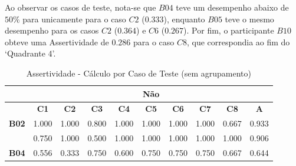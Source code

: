 Ao observar os casos de teste, nota-se que $B04$ teve um desempenho abaixo de $50\%$ para unicamente para o caso $C2$ ($0.333$), enquanto $B05$ teve o mesmo desempenho para os casos $C2$ ($0.364$) e $C6$ ($0.267$). Por fim, o participante $B10$ obteve uma Assertividade de $0.286$ para o caso $C8$, que correspondia ao fim do `Quadrante 4'.

\begin{table}[htbp]
	\centering
	\caption{Assertividade - Cálculo por Caso de Teste (sem agrupamento)}
	\begin{tabular}{|cccccccccc|}
		\hline
		\rowcolor[HTML]{D0CECE} 
		\multicolumn{1}{|c|}{\cellcolor[HTML]{F2F2F2}\textbf{Agrupamento}} & \multicolumn{9}{c|}{Não} \\ \hline
		\rowcolor[HTML]{D0CECE} 
		\multicolumn{1}{|c|}{\cellcolor[HTML]{D0CECE}\textbf{Participante}} & \multicolumn{1}{c|}{\cellcolor[HTML]{D0CECE}\textbf{C1}} & \multicolumn{1}{c|}{\cellcolor[HTML]{D0CECE}\textbf{C2}} & \multicolumn{1}{c|}{\cellcolor[HTML]{D0CECE}\textbf{C3}} & \multicolumn{1}{c|}{\cellcolor[HTML]{D0CECE}\textbf{C4}} & \multicolumn{1}{c|}{\cellcolor[HTML]{D0CECE}\textbf{C5}} & \multicolumn{1}{c|}{\cellcolor[HTML]{D0CECE}\textbf{C6}} & \multicolumn{1}{c|}{\cellcolor[HTML]{D0CECE}\textbf{C7}} & \multicolumn{1}{c|}{\cellcolor[HTML]{D0CECE}\textbf{C8}} & \textbf{A} \\ \hline
		\multicolumn{1}{|c|}{\textbf{B02}} & \multicolumn{1}{c|}{1.000} & \multicolumn{1}{c|}{1.000} & \multicolumn{1}{c|}{0.800} & \multicolumn{1}{c|}{1.000} & \multicolumn{1}{c|}{1.000} & \multicolumn{1}{c|}{1.000} & \multicolumn{1}{c|}{1.000} & \multicolumn{1}{c|}{0.667} & 0.933 \\ \hline
		\rowcolor[HTML]{F2F2F2} 
		\multicolumn{1}{|c|}{\cellcolor[HTML]{F2F2F2}\textbf{B03}} & \multicolumn{1}{c|}{\cellcolor[HTML]{F2F2F2}0.750} & \multicolumn{1}{c|}{\cellcolor[HTML]{F2F2F2}1.000} & \multicolumn{1}{c|}{\cellcolor[HTML]{F2F2F2}0.500} & \multicolumn{1}{c|}{\cellcolor[HTML]{F2F2F2}1.000} & \multicolumn{1}{c|}{\cellcolor[HTML]{F2F2F2}1.000} & \multicolumn{1}{c|}{\cellcolor[HTML]{F2F2F2}1.000} & \multicolumn{1}{c|}{\cellcolor[HTML]{F2F2F2}1.000} & \multicolumn{1}{c|}{\cellcolor[HTML]{F2F2F2}1.000} & 0.906 \\ \hline
		\multicolumn{1}{|c|}{\textbf{B04}} & \multicolumn{1}{c|}{0.556} & \multicolumn{1}{c|}{0.333} & \multicolumn{1}{c|}{0.750} & \multicolumn{1}{c|}{0.600} & \multicolumn{1}{c|}{0.750} & \multicolumn{1}{c|}{0.750} & \multicolumn{1}{c|}{0.750} & \multicolumn{1}{c|}{0.667} & 0.644 \\ \hline

\end{tabular}
\end{table}

